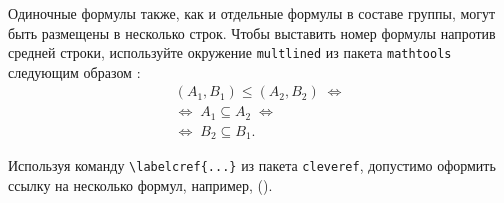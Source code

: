 Одиночные формулы также, как и отдельные формулы в составе группы, могут быть размещены в несколько строк. Чтобы выставить номер формулы напротив средней строки, используйте окружение \verb|multlined| из пакета \verb|mathtools| следующим образом \cite{Ganter1999}:
\begin{equation} %
\label{eq:fConcept-order-G}
\begin{multlined}
(A_1,B_1)\leq (A_2,B_2)\; \Leftrightarrow \\  \Leftrightarrow\; A_1\subseteq A_2\; \Leftrightarrow \\ \Leftrightarrow\; B_2\subseteq B_1. 
\end{multlined}
\end{equation}

	
Используя команду \verb|\labelcref{...}| из пакета \verb|cleveref|, допустимо оформить ссылку на несколько формул, например, ().
